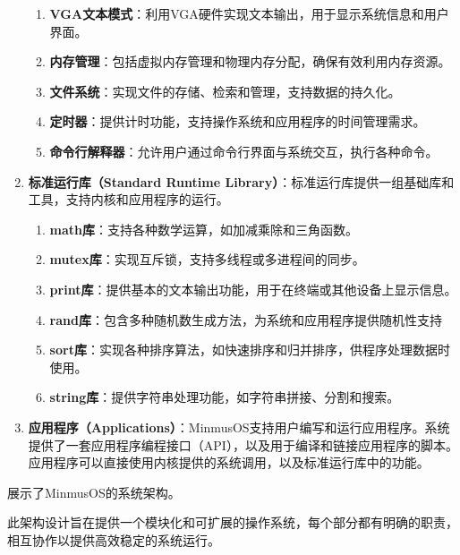 \begin{enumerate}
\begin{enumerate}
              \item \textbf{VGA文本模式}：利用VGA硬件实现文本输出，用于显示系统信息和用户界面。
              \item \textbf{内存管理}：包括虚拟内存管理和物理内存分配，确保有效利用内存资源。
              \item \textbf{文件系统}：实现文件的存储、检索和管理，支持数据的持久化。
              \item \textbf{定时器}：提供计时功能，支持操作系统和应用程序的时间管理需求。
              \item \textbf{命令行解释器}：允许用户通过命令行界面与系统交互，执行各种命令。
          \end{enumerate}
    \item \textbf{标准运行库（Standard Runtime Library）}：标准运行库提供一组基础库和工具，支持内核和应用程序的运行。
          \begin{enumerate}
              \item \textbf{math库}：支持各种数学运算，如加减乘除和三角函数。
              \item \textbf{mutex库}：实现互斥锁，支持多线程或多进程间的同步。
              \item \textbf{print库}：提供基本的文本输出功能，用于在终端或其他设备上显示信息。
              \item \textbf{rand库}：包含多种随机数生成方法，为系统和应用程序提供随机性支持
              \item \textbf{sort库}：实现各种排序算法，如快速排序和归并排序，供程序处理数据时使用。
              \item \textbf{string库}：提供字符串处理功能，如字符串拼接、分割和搜索。
          \end{enumerate}
    \item \textbf{应用程序（Applications）}：MinmusOS支持用户编写和运行应用程序。系统提供了一套应用程序编程接口（API），以及用于编译和链接应用程序的脚本。应用程序可以直接使用内核提供的系统调用，以及标准运行库中的功能。
\end{enumerate}

\label{fig:SystemArchitecture}展示了MinmusOS的系统架构。

此架构设计旨在提供一个模块化和可扩展的操作系统，每个部分都有明确的职责，相互协作以提供高效稳定的系统运行。

